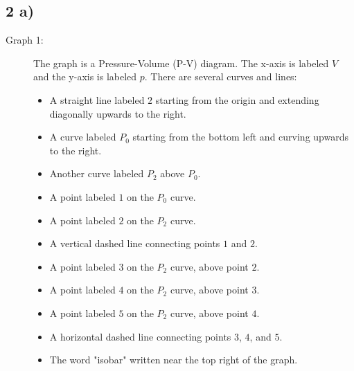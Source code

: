 \subsection*{2 a)}

\begin{description}
    \item[Graph 1:] The graph is a Pressure-Volume (P-V) diagram. The x-axis is labeled $V$ and the y-axis is labeled $p$. There are several curves and lines:
    \begin{itemize}
        \item A straight line labeled $2$ starting from the origin and extending diagonally upwards to the right.
        \item A curve labeled $P_0$ starting from the bottom left and curving upwards to the right.
        \item Another curve labeled $P_2$ above $P_0$.
        \item A point labeled $1$ on the $P_0$ curve.
        \item A point labeled $2$ on the $P_2$ curve.
        \item A vertical dashed line connecting points $1$ and $2$.
        \item A point labeled $3$ on the $P_2$ curve, above point $2$.
        \item A point labeled $4$ on the $P_2$ curve, above point $3$.
        \item A point labeled $5$ on the $P_2$ curve, above point $4$.
        \item A horizontal dashed line connecting points $3$, $4$, and $5$.
        \item The word "isobar" written near the top right of the graph.
    \end{itemize}
    

\end{description}
